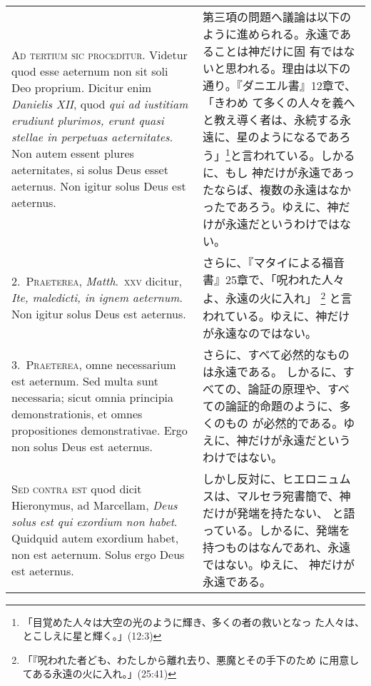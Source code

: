 \documentclass[10pt]{jsarticle} %
\begin{document}
\begin{longtable}{p{21em}p{21em}}
{\huge A}{\scshape d tertium sic proceditur}. Videtur quod esse aeternum
non sit soli Deo proprium. Dicitur enim {\it Danielis XII}, quod
{\itshape qui ad iustitiam erudiunt plurimos, erunt quasi stellae in
perpetuas aeternitates}. Non autem essent plures aeternitates, si solus
Deus esset aeternus. Non igitur solus Deus est aeternus.


&

第三項の問題へ議論は以下のように進められる。永遠であることは神だけに固
有ではないと思われる。理由は以下の通り。『ダニエル書』12章で、「きわめ
て多くの人々を義へと教え導く者は、永続する永遠に、星のようになるであろ
う」\footnote{「目覚めた人々は大空の光のように輝き、多くの者の救いとなっ
た人々は、とこしえに星と輝く。」(12:3)}と言われている。しかるに、もし
神だけが永遠であったならば、複数の永遠はなかったであろう。ゆえに、神だ
けが永遠だというわけではない。

\\


2.~{\scshape Praeterea}, {\it Matth}.~{\scshape xxv} dicitur, {\itshape
Ite, maledicti, in ignem aeternum}. Non igitur solus Deus est aeternus.

&

さらに、『マタイによる福音書』25章で、「呪われた人々よ、永遠の火に入れ」
 \footnote{「『呪われた者ども、わたしから離れ去り、悪魔とその手下のため
 に用意してある永遠の火に入れ。」(25:41)}
と言われている。ゆえに、神だけが永遠なのではない。

\\

3.~{\scshape Praeterea}, omne necessarium est aeternum. Sed multa sunt
necessaria; sicut omnia principia demonstrationis, et omnes
propositiones demonstrativae. Ergo non solus Deus est aeternus.


&


さらに、すべて必然的なものは永遠である。
しかるに、すべての、論証の原理や、すべての論証的命題のように、多くのもの
が必然的である。ゆえに、神だけが永遠だというわけではない。

\\

{\scshape Sed contra est} quod dicit Hieronymus, ad Marcellam, {\itshape
Deus solus est qui exordium non habet}. Quidquid autem exordium habet,
non est aeternum. Solus ergo Deus est aeternus.  

&

しかし反対に、ヒエロニュムスは、マルセラ宛書簡で、神だけが発端を持たない、
と語っている。しかるに、発端を持つものはなんであれ、永遠ではない。ゆえに、
神だけが永遠である。



\end{longtable}
\end{document}
